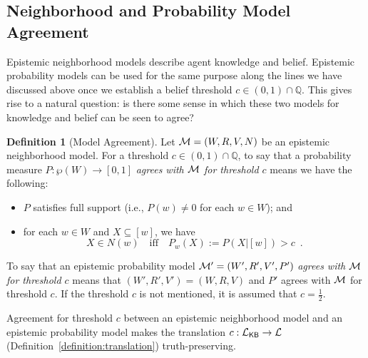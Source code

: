 \documentclass[12pt]{article}
\theoremstyle{definition}
\newtheorem{definition}[theorem]{Definition}
\newcommand{\Rat}{\mathbb{Q}}  %
\newcommand{\M}{{\cal M}}      %
\newcommand{\Lang}{{\cal L}}   %
\newcommand{\KB}{{\mathsf{KB}}}                 %
\begin{document}
\subsection{Neighborhood and Probability Model Agreement}

Epistemic neighborhood models describe agent knowledge and belief.
Epistemic probability models can be used for the same purpose along
the lines we have discussed above once we establish a belief threshold
$c\in(0,1)\cap\Rat$.  This gives rise to a natural question: is there
some sense in which these two models for knowledge and belief can be
seen to agree?

\begin{definition}[Model Agreement]
  Let $\M=(W,R,V,N)$ be an epistemic neighborhood model. For a
  threshold $c\in(0,1)\cap\Rat$, to say that a probability measure
  $P:\wp(W)\to[0,1]$ \emph{agrees with $\M$ for threshold $c$} means
  we have the following:
  \begin{itemize}
  \item $P$ satisfies full support (i.e., $P(w)\neq0$ for each
    $w\in W$); and

  \item for each $w\in W$ and $X\subseteq[w]$, we have
    \[
    X\in N(w) \quad\text{iff}\quad
    P_w(X):=P(X|[w])>c\enspace.
    \]
  \end{itemize}
  To say that an epistemic probability model $\M'=(W',R',V',P')$
  \emph{agrees with $\M$ for threshold $c$} means that
  $(W',R',V')=(W,R,V)$ and $P'$ agrees with $\M$ for threshold $c$.
  If the threshold $c$ is not mentioned, it is assumed that
  $c=\frac 12$.
\end{definition}

Agreement for threshold $c$ between an epistemic neighborhood model
and an epistemic probability model makes the translation
$c:\Lang_\KB\to\Lang$ (Definition~\ref{definition:translation})
truth-preserving.
\end{document}
